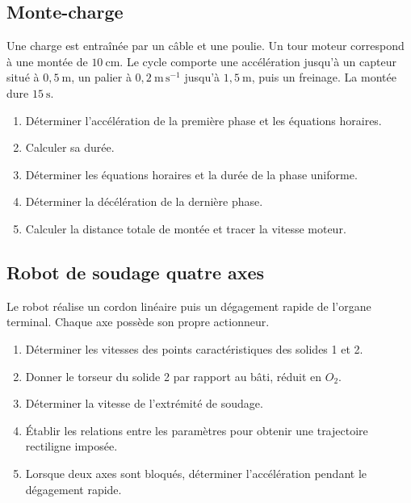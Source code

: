 \subsection{Monte-charge}

Une charge est entraînée par un câble et une poulie. Un tour moteur
correspond à une montée de $10\ \mathrm{cm}$. Le cycle comporte une
accélération jusqu'à un capteur situé à $0{,}5\ \mathrm m$, un palier à
$0{,}2\ \mathrm{m\,s^{-1}}$ jusqu'à $1{,}5\ \mathrm m$, puis un
freinage. La montée dure $15\ \mathrm s$.


\begin{enumerate}
  \item Déterminer l'accélération de la première phase et les équations horaires.
  \item Calculer sa durée.
  \item Déterminer les équations horaires et la durée de la phase uniforme.
  \item Déterminer la décélération de la dernière phase.
  \item Calculer la distance totale de montée et tracer la vitesse moteur.
\end{enumerate}

\subsection{Robot de soudage quatre axes}

Le robot réalise un cordon linéaire puis un dégagement rapide de
l'organe terminal. Chaque axe possède son propre actionneur.

\begin{center}
\hfill
{}\hfill
{}
\end{center}

\begin{enumerate}
  \item Déterminer les vitesses des points caractéristiques des solides 1 et 2.
  \item Donner le torseur du solide 2 par rapport au bâti, réduit en $O_2$.
  \item Déterminer la vitesse de l'extrémité de soudage.
  \item Établir les relations entre les paramètres pour obtenir une trajectoire rectiligne imposée.
  \item Lorsque deux axes sont bloqués, déterminer l'accélération pendant le dégagement rapide.
\end{enumerate}


